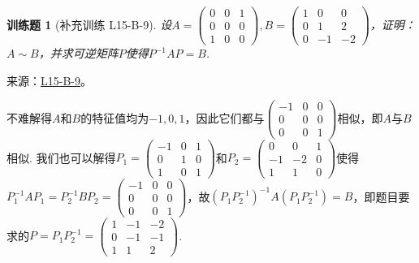 \documentclass[12pt,fontset=fandol]{ctexart}
\newtheorem{exercise}{训练题}[section]
\begin{document}
\begin{exercise}[补充训练 L15-B-9]\label{prob:L15-B-9}
设$A=\begin{pmatrix}
                0 & 0 & 1 \\ 0 & 0 & 0 \\ 1 & 0 & 0
            \end{pmatrix},B=\begin{pmatrix}
                1 & 0 & 0 \\ 0 & 1 & 2 \\ 0 & -1 & -2
            \end{pmatrix}$，证明：$A\sim B$，并求可逆矩阵$P$使得$P^{-1}AP=B$.
\end{exercise}
\noindent 来源：\href{https://github.com/yhwu-is/Linear-Algebra-Left-Undone/blob/new/%E8%AE%B2%E4%B9%89/%E4%B8%93%E9%A2%98/15%20%E7%9B%B8%E4%BC%BC%E6%A0%87%E5%87%86%E5%BD%A2%EF%BC%9A%E5%A4%8D%E6%95%B0%E5%9F%9F%E4%B8%8A%E7%9A%84%E5%B0%9D%E8%AF%95%E4%B8%8E%E7%90%86%E8%AE%BA.tex}{L15-B-9}。
\begin{solve}
不难解得$A$和$B$的特征值均为$-1,0,1$，因此它们都与$\begin{pmatrix}
                -1 & 0 & 0 \\ 0 & 0 & 0 \\ 0 & 0 & 1
            \end{pmatrix}$相似，即$A$与$B$相似. 我们也可以解得$P_1=\begin{pmatrix}
                -1 & 0 & 1 \\ 0 & 1 & 0 \\ 1 & 0 & 1
            \end{pmatrix}$和$P_2=\begin{pmatrix}
                0 & 0 & 1 \\ -1 & -2 & 0 \\ 1 & 1 & 0
            \end{pmatrix}$使得$P_1^{-1}AP_1=P_2^{-1}BP_2=\begin{pmatrix}
                -1 & 0 & 0 \\ 0 & 0 & 0 \\ 0 & 0 & 1
            \end{pmatrix}$，故$(P_1P_2^{-1})^{-1}A(P_1P_2^{-1})=B$，即题目要求的$P=P_1P_2^{-1}=\begin{pmatrix}
                1 & -1 & -2 \\ 0 & -1 & -1 \\ 1 & 1 & 2
            \end{pmatrix}$.
\end{solve}
\end{document}
